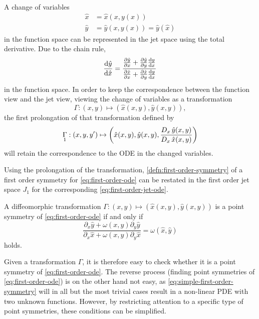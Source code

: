 A change of variables
\begin{align*}
  \hat{x} &= \hat{x}(x, y(x))\\
  \hat{y} &= \hat{y}(x, y(x)) = \hat{y}(\hat{x})
\end{align*}
in the function space can be represented in the jet space using the total derivative.
Due to the chain rule,
\begin{equation*}
  \diff{\hat{y}}{\hat{x}} = 
  \frac{\diffp{\hat{y}}{x} + \diffp{\hat{y}}{y} \diff{y}{x}}{\diffp{\hat{x}}{x} + \diffp{\hat{x}}{y} \diff{y}{x}}
\end{equation*}
in the function space.
In order to keep the correspondence between the function view and the jet view, viewing the change of variables as a transformation
\begin{equation*}
  \Gamma: \left(x,y\right) \mapsto \left(\hat{x}(x,y), \hat{y}(x,y)\right),
\end{equation*}
the first prolongation of that transformation defined by
\begin{equation*}
  \prolong{\Gamma}{1}: \left(x,y,y'\right) \mapsto \left(\hat{x}(x,y), \hat{y}(x,y), \frac{\tD{x} \hat{y}(x,y)}{\tD{x} \hat{x}(x,y)}\right)
\end{equation*}
will retain the correspondence to the ODE in the changed variables.

Using the prolongation of the transformation, \cref{defn:first-order-symmetry} of a first order symmetry for \cref{eq:first-order-ode} can be restated in the first order jet space \(J_1\) for the corresponding \cref{eq:first-order-jet-ode}.
\begin{lem} \label{lem:simple-first-order-symmetry}
  A diffeomorphic transformation \(\Gamma: \left(x,y\right) \mapsto \left(\hat{x}(x,y), \hat{y}(x,y)\right)\) is a point symmetry of \cref{eq:first-order-ode} if and only if
  \begin{equation} \label{eq:simple-first-order-symmetry}
    \frac{\partial_x \hat{y} + \omega(x,y) \partial_y \hat{y}}{\partial_x \hat{x} + \omega(x,y) \partial_y \hat{x}} = \omega(\hat{x},\hat{y})
  \end{equation}
  holds.
\end{lem}
Given a transformation \(\Gamma\), it is therefore easy to check whether it is a point symmetry of \cref{eq:first-order-ode}.
The reverse process (finding point symmetries of \cref{eq:first-order-ode}) is on the other hand not easy, as \cref{eq:simple-first-order-symmetry} will in all but the most trivial cases result in a non-linear PDE with two unknown functions.
However, by restricting attention to a specific type of point symmetries, these conditions can be simplified.

